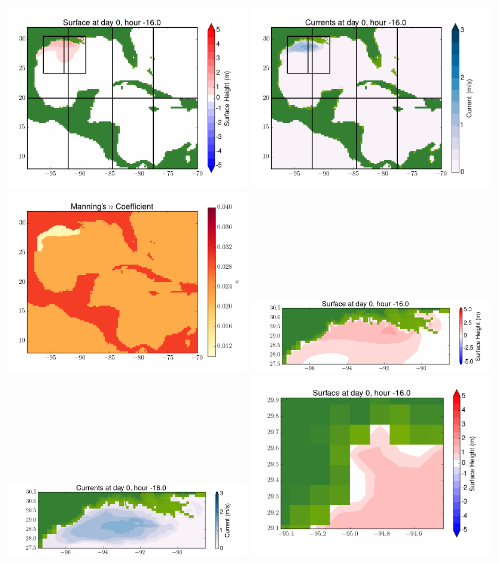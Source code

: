 \documentclass[11pt]{article}
\begin{document}
\vskip 10pt 
\includegraphics[width=0.475\textwidth]{frame0056fig1.png}
\includegraphics[width=0.475\textwidth]{frame0056fig2.png}
\vskip 10pt 
\includegraphics[width=0.475\textwidth]{frame0056fig3.png}
\includegraphics[width=0.475\textwidth]{frame0056fig4.png}
\vskip 10pt 
\includegraphics[width=0.475\textwidth]{frame0056fig5.png}
\includegraphics[width=0.475\textwidth]{frame0056fig6.png}
\end{document}
